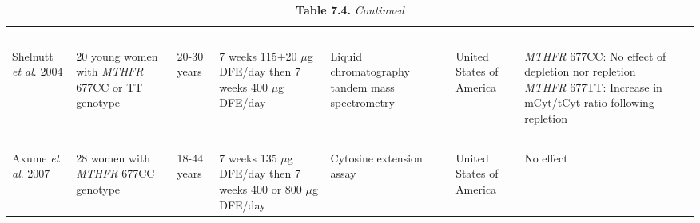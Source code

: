 \begin{sidewaystable}
\caption*{\textbf{Table 7.4.} \emph{Continued}}
\label{table7_4}
\begin{adjustbox}{width=18cm}
\begin{tabular}{L{2.1cm}C{2cm}C{2.3cm}C{3.5cm}C{2.3cm}C{1.5cm}C{6.5cm}}
~ & ~ & ~ & ~ & ~\\
{Shelnutt }{\textit{et al}}{. 2004 \cite{c75}} &
20 young women with \textit{MTHFR} 677CC or TT genotype &
20-30 years &
{ 7 weeks 115\textrm{${\pm}$}20 $\mu$g DFE/day then} 7 weeks 400 $\mu$g DFE/day &
Liquid chromatography tandem mass spectrometry &
United States of America &
{ \textit{MTHFR} 677CC: No effect of depletion nor repletion} ~ { \textit{MTHFR} 677TT:}  Increase in mCyt/tCyt ratio following repletion\\
~ & ~ & ~ & ~ & ~ & ~ & ~\\
{ {Axume }{\textit{et al}}{. 2007 \cite{c799}}} ~ &
28 women with \textit{MTHFR} 677CC genotype &
18-44 years &
{ 7 weeks 135 $\mu$g DFE/day then} 7 weeks 400 or 800 $\mu$g DFE/day &
Cytosine extension assay &
United States of America &
No effect\\
\hline
\end{tabular}
\end{adjustbox}
\end{sidewaystable}

